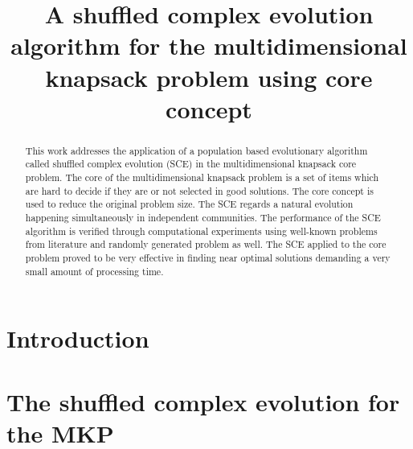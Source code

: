 \documentclass[10pt,conference, compsocconf]{IEEEtran}
\begin{document}
\title{A shuffled complex evolution algorithm for
the multidimensional knapsack problem using core concept}

\author{
\and
{}
}

\maketitle

\begin{abstract}
This work addresses the application of
a population based evolutionary algorithm
called shuffled complex evolution (SCE) in the multidimensional knapsack
core problem.
The core of the multidimensional knapsack problem is a set of items which are
hard to decide if they are or not selected in good solutions.
The core concept is used to reduce the original problem size.
The SCE regards a natural evolution happening simultaneously in independent communities.
The performance of the SCE algorithm is verified through computational experiments
using well-known problems from literature and randomly generated problem as well.
The SCE applied to the core problem proved to be very effective in finding near
optimal solutions demanding a very small amount of processing time.

\end{abstract}
\IEEEpeerreviewmaketitle

\section{Introduction}
\label{sec:intro}


\section{The shuffled complex evolution for the MKP}
\label{sec:sce}

\end{document}
